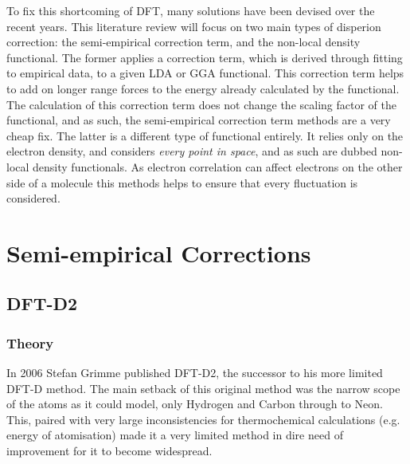 \documentclass[10pt,a4paper,twocolumn,twoside]{extarticle}
\begin{document}
	To fix this shortcoming of DFT, many solutions have been devised over the recent years. This literature review will focus on two main types of disperion correction: the semi-empirical correction term, and the non-local density functional. The former applies a correction term, which is derived through fitting to empirical data, to a given LDA or GGA functional. This correction term helps to add on longer range forces to the energy already calculated by the functional. The calculation of this correction term does not change the scaling factor of the functional, and as such, the semi-empirical correction term methods are a very cheap fix. The latter is a different type of functional entirely. It relies only on the electron density, and considers \emph{every point in space}, and as such are dubbed non-local density functionals. As electron correlation can affect electrons on the other side of a molecule this methods helps to ensure that every fluctuation is considered.
	

	\section{Semi-empirical Corrections}
	\label{sec:semi-empirical}
	\subsection{DFT-D2}
	\subsubsection{Theory}
	In 2006 Stefan Grimme published DFT-D2\cite{Grimme2006}, 
	the successor to his more limited DFT-D method. The main setback of this original method was the narrow scope of the atoms as it could model, only Hydrogen and Carbon through to Neon. This, paired with very large inconsistencies for thermochemical calculations (e.g. energy of atomisation) made it a very limited method in dire need of improvement for it to become widespread.
\end{document}
